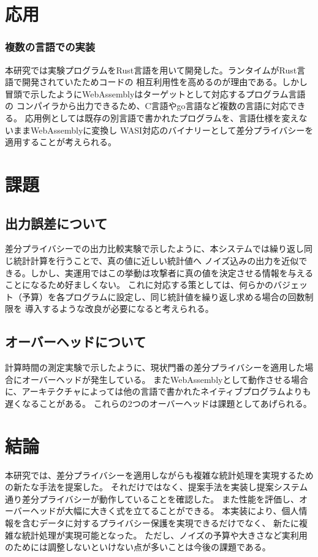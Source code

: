 \documentclass[a4paper,11pt]{jreport}
\begin{document}
\chapter{応用}

\subsection{複数の言語での実装}

本研究では実験プログラムをRust言語を用いて開発した。ランタイムがRust言語で開発されていたためコードの
相互利用性を高めるのが理由である。しかし冒頭で示したようにWebAssemblyはターゲットとして対応するプログラム言語の
コンパイラから出力できるため、C言語やgo言語など複数の言語に対応できる。
応用例としては既存の別言語で書かれたプログラムを、言語仕様を変えないままWebAssemblyに変換し
WASI対応のバイナリーとして差分プライバシーを適用することが考えられる。

\chapter{課題}

\section{出力誤差について}

差分プライバシーでの出力比較実験で示したように、本システムでは繰り返し同じ統計計算を行うことで、真の値に近しい統計値へ
ノイズ込みの出力を近似できる。しかし、実運用ではこの挙動は攻撃者に真の値を決定させる情報を与えることになるため好ましくない。
これに対応する策としては、何らかのバジェット（予算）を各プログラムに設定し、同じ統計値を繰り返し求める場合の回数制限を
導入するような改良が必要になると考えられる。

\section{オーバーヘッドについて}

計算時間の測定実験で示したように、現状門番の差分プライバシーを適用した場合にオーバーヘッドが発生している。
またWebAssemblyとして動作させる場合に、アーキテクチャによっては他の言語で書かれたネイティブプログラムよりも遅くなることがある。
これらの2つのオーバーヘッドは課題としてあげられる。

\chapter{結論}
本研究では、差分プライバシーを適用しながらも複雑な統計処理を実現するための新たな手法を提案した。
それだけではなく、提案手法を実装し提案システム通り差分プライバシーが動作していることを確認した。
また性能を評価し、オーバーヘッドが大幅に大きく式を立てることができる。
本実装により、個人情報を含むデータに対するプライバシー保護を実現できるだけでなく、
新たに複雑な統計処理が実現可能となった。
ただし、ノイズの予算や大きさなど実利用のためには調整しないといけない点が多いことは今後の課題である。
\end{document}
